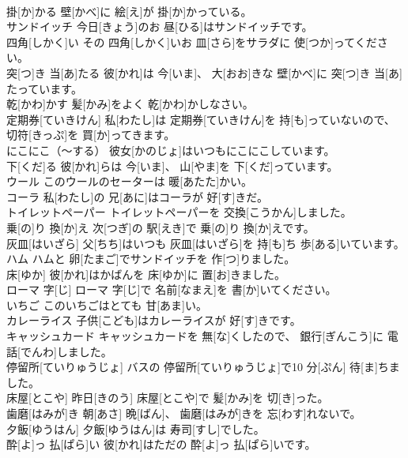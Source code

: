 \documentclass[8pt]{extreport}
\begin{document}
\begin{CJK}{UTF8}{min}
\\	掛[か]かる	壁[かべ]に 絵[え]が 掛[か]かっている。		
\\	サンドイッチ	今日[きょう]のお 昼[ひる]はサンドイッチです。		
\\	四角[しかく]い	その 四角[しかく]いお 皿[さら]をサラダに 使[つか]ってください。		
\\	突[つ]き 当[あ]たる	彼[かれ]は 今[いま]、 大[おお]きな 壁[かべ]に 突[つ]き 当[あ]たっています。		
\\	乾[かわ]かす	髪[かみ]をよく 乾[かわ]かしなさい。		
\\	定期券[ていきけん]	私[わたし]は 定期券[ていきけん]を 持[も]っていないので、 切符[きっぷ]を 買[か]ってきます。		
\\	にこにこ（～する）	彼女[かのじょ]はいつもにこにこしています。		
\\	下[くだ]る	彼[かれ]らは 今[いま]、 山[やま]を 下[くだ]っています。		
\\	ウール	このウールのセーターは 暖[あたた]かい。		
\\	コーラ	私[わたし]の 兄[あに]はコーラが 好[す]きだ。		
\\	トイレットペーパー	トイレットペーパーを 交換[こうかん]しました。		
\\	乗[の]り 換[か]え	次[つぎ]の 駅[えき]で 乗[の]り 換[か]えです。		
\\	灰皿[はいざら]	父[ちち]はいつも 灰皿[はいざら]を 持[も]ち 歩[ある]いています。		
\\	ハム	ハムと 卵[たまご]でサンドイッチを 作[つ]りました。		
\\	床[ゆか]	彼[かれ]はかばんを 床[ゆか]に 置[お]きました。		
\\	ローマ 字[じ]	ローマ 字[じ]で 名前[なまえ]を 書[か]いてください。		
\\	いちご	このいちごはとても 甘[あま]い。		
\\	カレーライス	子供[こども]はカレーライスが 好[す]きです。		
\\	キャッシュカード	キャッシュカードを 無[な]くしたので、 銀行[ぎんこう]に 電話[でんわ]しました。		
\\	停留所[ていりゅうじょ]	バスの 停留所[ていりゅうじょ]で10 分[ぷん] 待[ま]ちました。		
\\	床屋[とこや]	昨日[きのう] 床屋[とこや]で 髪[かみ]を 切[き]った。		
\\	歯磨[はみが]き	朝[あさ] 晩[ばん]、 歯磨[はみが]きを 忘[わす]れないで。		
\\	夕飯[ゆうはん]	夕飯[ゆうはん]は 寿司[すし]でした。		
\\	酔[よ]っ 払[ぱら]い	彼[かれ]はただの 酔[よ]っ 払[ぱら]いです。		

\end{CJK}
\end{document}
